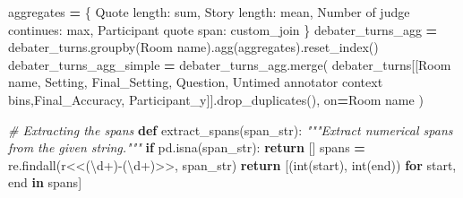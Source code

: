 \documentclass[
]{article}
\newenvironment{Shaded}{\begin{snugshade}}{\end{snugshade}}
\newcommand{\BuiltInTok}[1]{#1}
\newcommand{\CommentTok}[1]{\textcolor[rgb]{0.56,0.35,0.01}{\textit{#1}}}
\newcommand{\ControlFlowTok}[1]{\textcolor[rgb]{0.13,0.29,0.53}{\textbf{#1}}}
\newcommand{\KeywordTok}[1]{\textcolor[rgb]{0.13,0.29,0.53}{\textbf{#1}}}
\newcommand{\NormalTok}[1]{#1}
\newcommand{\OperatorTok}[1]{\textcolor[rgb]{0.81,0.36,0.00}{\textbf{#1}}}
\newcommand{\StringTok}[1]{\textcolor[rgb]{0.31,0.60,0.02}{#1}}
\newcommand{\VerbatimStringTok}[1]{\textcolor[rgb]{0.31,0.60,0.02}{#1}}
\begin{document}
\begin{Shaded}
\begin{Highlighting}[]
\NormalTok{aggregates }\OperatorTok{=}\NormalTok{ \{}
    \StringTok{\textquotesingle{}Quote length\textquotesingle{}}\NormalTok{: }\StringTok{\textquotesingle{}sum\textquotesingle{}}\NormalTok{,}
    \StringTok{\textquotesingle{}Story length\textquotesingle{}}\NormalTok{: }\StringTok{\textquotesingle{}mean\textquotesingle{}}\NormalTok{,}
    \StringTok{\textquotesingle{}Number of judge continues\textquotesingle{}}\NormalTok{: }\StringTok{\textquotesingle{}max\textquotesingle{}}\NormalTok{,}
    \StringTok{\textquotesingle{}Participant quote span\textquotesingle{}}\NormalTok{: custom\_join}
\NormalTok{\}}
\NormalTok{debater\_turns\_agg }\OperatorTok{=}\NormalTok{ debater\_turns.groupby(}\StringTok{\textquotesingle{}Room name\textquotesingle{}}\NormalTok{).agg(aggregates).reset\_index()}
\NormalTok{debater\_turns\_agg\_simple }\OperatorTok{=}\NormalTok{ debater\_turns\_agg.merge(}
\NormalTok{    debater\_turns[[}\StringTok{\textquotesingle{}Room name\textquotesingle{}}\NormalTok{, }\StringTok{\textquotesingle{}Setting\textquotesingle{}}\NormalTok{, }\StringTok{\textquotesingle{}Final\_Setting\textquotesingle{}}\NormalTok{, }\StringTok{\textquotesingle{}Question\textquotesingle{}}\NormalTok{, }\StringTok{\textquotesingle{}Untimed annotator context bins\textquotesingle{}}\NormalTok{,}\StringTok{\textquotesingle{}Final\_Accuracy\textquotesingle{}}\NormalTok{, }\StringTok{\textquotesingle{}Participant\_y\textquotesingle{}}\NormalTok{]].drop\_duplicates(),}
\NormalTok{    on}\OperatorTok{=}\StringTok{\textquotesingle{}Room name\textquotesingle{}}
\NormalTok{)}


\CommentTok{\# Extracting the spans}
\KeywordTok{def}\NormalTok{ extract\_spans(span\_str):}
    \CommentTok{"""Extract numerical spans from the given string."""}
    \ControlFlowTok{if}\NormalTok{ pd.isna(span\_str):}
        \ControlFlowTok{return}\NormalTok{ []}
\NormalTok{    spans }\OperatorTok{=}\NormalTok{ re.findall(}\VerbatimStringTok{r\textquotesingle{}\textless{}\textless{}(\textbackslash{}d+){-}(\textbackslash{}d+)\textgreater{}\textgreater{}\textquotesingle{}}\NormalTok{, span\_str)}
    \ControlFlowTok{return}\NormalTok{ [(}\BuiltInTok{int}\NormalTok{(start), }\BuiltInTok{int}\NormalTok{(end)) }\ControlFlowTok{for}\NormalTok{ start, end }\KeywordTok{in}\NormalTok{ spans]}


\end{Highlighting}
\end{Shaded}
\end{document}
